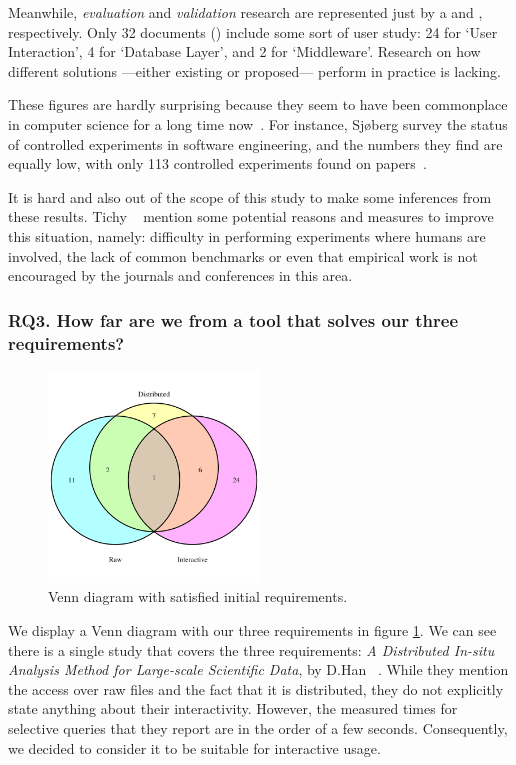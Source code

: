 Meanwhile, \emph{evaluation} and \emph{validation} research are represented
just by a  and , respectively.
Only 32 documents () include some sort of user study:
24 for `User Interaction', 4 for `Database  Layer', and 2 for `Middleware'.
Research on how different solutions ---either existing or proposed--- perform in
practice is lacking.

These figures are hardly surprising because they seem to have been commonplace
in computer science for a long time now~\cite{TICHY1995,ZELKOWITZ1997,Sjoberg2005}.
For instance, Sjøberg \etal survey the status of controlled experiments
in software engineering, and the numbers they find are equally low, with
only 113 controlled experiments found on  papers~\cite{Sjoberg2005}.

It is hard and also out of the scope of this study to make some inferences from these
results. Tichy \etal~\cite{TICHY1995} mention some potential reasons and measures
to improve this situation, namely: difficulty in performing experiments where humans
are involved, the lack of common benchmarks or even that empirical work is not
encouraged by the journals and conferences in this area.

\subsubsection{RQ3. How far are we from a tool that solves our three requirements?}

\begin{figure}[htbp]
    \centering
    \includegraphics[width=0.5\textwidth]{images/3_mapping/venn}
    \caption{Venn diagram with satisfied initial requirements.}
    \label{fig:mapping/venn_requirements}
\end{figure}

We display a Venn diagram with our three requirements in figure \ref{fig:mapping/venn_requirements}. We can see there is a single study that covers the three requirements:
\textit{{A} {D}istributed {I}n-situ {A}nalysis {M}ethod for {L}arge-scale
{S}cientific {D}ata}, by D.Han \etal~\cite{Han2017}. While they mention the
access over raw files and the fact that it is distributed, they do not
explicitly state anything about their interactivity. However, the measured times
for selective queries that they report are in the order of a few seconds. Consequently, we
decided to consider it to be suitable for interactive usage.

